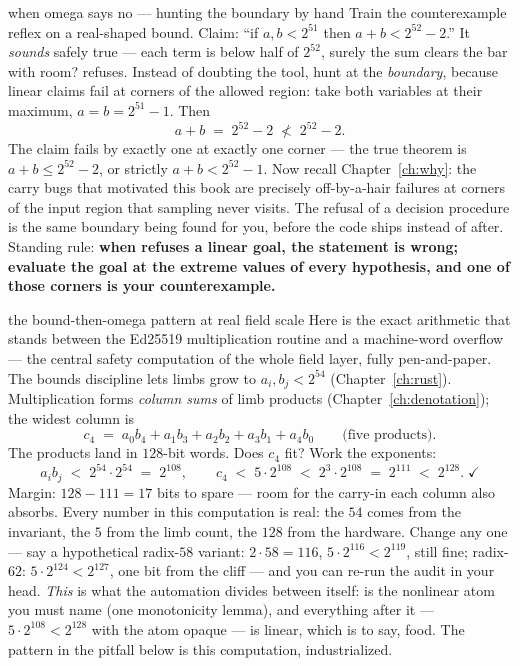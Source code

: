 \begin{worked}{when omega says no --- hunting the boundary by hand}
Train the counterexample reflex on a real-shaped bound. Claim: ``if
$a, b < 2^{51}$ then $a + b < 2^{52} - 2$.'' It \emph{sounds} safely true
--- each term is below half of $2^{52}$, surely the sum clears the bar
with room?  refuses. Instead of doubting the tool, hunt at the
\emph{boundary}, because linear claims fail at corners of the allowed
region: take both variables at their maximum, $a = b = 2^{51} - 1$. Then
\[
a + b \;=\; 2^{52} - 2
\;\not<\; 2^{52} - 2 .
\]
The claim fails by exactly one at exactly one corner --- the true theorem
is $a + b \le 2^{52} - 2$, or strictly $a + b < 2^{52} - 1$. Now recall
Chapter~\ref{ch:why}: the carry bugs that motivated this book are
precisely off-by-a-hair failures at corners of the input region that
sampling never visits. The refusal of a decision procedure is the same
boundary being found for you, before the code ships instead of after.
Standing rule: \textbf{when  refuses a linear goal, the
statement is wrong; evaluate the goal at the extreme values of every
hypothesis, and one of those corners is your counterexample.}
\end{worked}

\begin{worked}{the bound-then-omega pattern at real field scale}
Here is the exact arithmetic that stands between the Ed25519
multiplication routine and a machine-word overflow --- the central safety
computation of the whole field layer, fully pen-and-paper. The bounds
discipline lets limbs grow to $a_i, b_j < 2^{54}$
(Chapter~\ref{ch:rust}). Multiplication forms \emph{column sums} of limb
products (Chapter~\ref{ch:denotation}); the widest column is
\[
c_4 \;=\; a_0 b_4 + a_1 b_3 + a_2 b_2 + a_3 b_1 + a_4 b_0
\qquad\text{(five products).}
\]
The products land in $128$-bit words. Does $c_4$ fit? Work the exponents:
\[
a_i b_j \;<\; 2^{54} \cdot 2^{54} \;=\; 2^{108},
\qquad
c_4 \;<\; 5 \cdot 2^{108} \;<\; 2^{3} \cdot 2^{108} \;=\; 2^{111}
\;<\; 2^{128}. \;\checkmark
\]
Margin: $128 - 111 = 17$ bits to spare --- room for the carry-in each
column also absorbs. Every number in this computation is real: the $54$
comes from the invariant, the $5$ from the limb count, the $128$ from the
hardware. Change any one --- say a hypothetical radix-$58$ variant:
$2 \cdot 58 = 116$, $5 \cdot 2^{116} < 2^{119}$, still fine; radix-$62$:
$5 \cdot 2^{124} < 2^{127}$, one bit from the cliff --- and you can
re-run the audit in your head. \emph{This} is what the automation
divides between itself:  is the nonlinear atom you
must name (one monotonicity lemma), and everything after it ---
$5 \cdot 2^{108} < 2^{128}$ with the atom opaque --- is linear, which is
to say,  food. The pattern in the pitfall below is this
computation, industrialized.
\end{worked}

